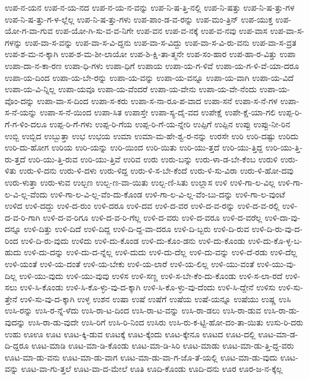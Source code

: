 {ಉಪ-ನ-ಯನ
ಉಪ-ನ-ಯ-ನದ
ಉಪ-ನ-ಯ-ನ-ವನ್ನು
ಉಪ-ನಿ-ಷ-ತ್ತಿ-ನಲ್ಲಿ
ಉಪ-ನಿ-ಷತ್ತು
ಉಪ-ನಿ-ಷ-ತ್ತು-ಗಳ
ಉಪ-ನಿ-ಷ-ತ್ತು-ಗ-ಳ-ಲ್ಲೆಲ್ಲ
ಉಪ-ನಿ-ಷ-ತ್ತು-ಗಳು
ಉಪ-ಪಾಂ-ಡ-ವ-ರನ್ನು
ಉಪ-ಮಂ-ತ್ರಿನ್
ಉಪ-ಯುಕ್ತ
ಉಪ-ಯೋ-ಗ-ವಾ-ಗುವ
ಉಪ-ಯೋ-ಗಿ-ಸು-ವ-ವ-ನಿಗೇ
ಉಪ-ವನ
ಉಪ-ವ-ನಕ್ಕೆ
ಉಪ-ವ-ನವು
ಉಪ-ವಾಸ
ಉಪ-ವಾ-ಸ-ಗಳನ್ನು
ಉಪ-ವಾ-ಸ-ವನ್ನು
ಉಪ-ವಾ-ಸ-ವಿ-ದ್ದನು
ಉಪ-ವಾ-ಸ-ವಿದ್ದು
ಉಪ-ವಾ-ಸ-ವಿ-ರು-ವನು
ಉಪ-ವಾ-ಸ-ವ್ರತ
ಉಪ-ಶ-ಮ-ನ-ಕ್ಕಾಗಿ
ಉಪ-ಶ-ಮ-ಶೀ-ಲಾಯೋ
ಉಪ-ಶಿ-ಕ್ಷಿ-ತಾ-ತ್ಮನೇ
ಉಪ-ಸಂ-ಹಾರ
ಉಪ-ಹಾ-ರ-ವಿತ್ತು
ಉಪಾ
ಉಪಾ-ದಾ-ನ-ಕಾ-ರಣ
ಉಪಾ-ಧಿ-ಗಳು
ಉಪಾ-ಧಿಗೆ
ಉಪಾಯ
ಉಪಾ-ಯ-ಗ-ಳಿವೆ
ಉಪಾ-ಯ-ಗ-ಳಿ-ವೆ-ಯಾ-ದರೂ
ಉಪಾ-ಯ-ದಿಂದ
ಉಪಾ-ಯ-ಬೇ-ರನ್ನು
ಉಪಾ-ಯ-ವನ್ನು
ಉಪಾ-ಯ-ವನ್ನೂ
ಉಪಾ-ಯ-ವಾಗಿ
ಉಪಾ-ಯ-ವಿದೆ
ಉಪಾ-ಯ-ವಿ-ನ್ನಿಲ್ಲ
ಉಪಾ-ಯವೂ
ಉಪಾ-ಯ-ವೆಂದರೆ
ಉಪಾ-ಯ-ವೇನು
ಉಪಾ-ಯ-ವೇ-ನೆಂದು
ಉಪಾ-ಯ-ವೊಂ-ದನ್ನು
ಉಪಾ-ವಾ-ಸ-ದಿಂದ
ಉಪಾ-ಸ-ಕರು
ಉಪಾ-ಸ-ನಾ-ರೂ-ಪ-ವಾದ
ಉಪಾ-ಸನೆ
ಉಪಾ-ಸ-ನೆ-ಗಳ
ಉಪಾ-ಸ-ನೆ-ಯನ್ನು
ಉಪಾ-ಸ-ನೆ-ಯಿಂದ
ಉಪಾ-ಸಿತ
ಉಪಾಸ್ತೇ
ಉಪಾ-ಸ್ಯ-ದೈ-ವದ
ಉಪೇಕ್ಷೆ
ಉಪೇ-ಕ್ಷೆ-ಯಾ-ಗಲಿ
ಉಪ್ಪ-ರಿ-ಗೆ-ಗ-ಳಿಂ-ದಲೂ
ಉಪ್ಪ-ರಿ-ಗೆ-ಗಳು
ಉಪ್ಪ-ರಿ-ಗೆಯ
ಉಪ್ಪ-ರಿ-ಗೆ-ಯ-ನ್ನೇರಿ
ಉಪ್ಪಿಗೆ
ಉಪ್ಪಿನ
ಉಪ್ಪು
ಉಪ್ಪು-ನೀ-ರಿನ
ಉಬ್ಬಿ
ಉಬ್ಬಿದ
ಉಬ್ಬುತ್ತಾ
ಉಭ
ಉಭಯ
ಉಮಾ
ಉಮಾ-ಮ-ಹೇ-ಶ್ವ-ರ-ನನ್ನು
ಉರಸೇ
ಉರಿ
ಉರಿ-ದಷ್ಟು
ಉರಿದು
ಉರಿ-ದು-ಹೋಗ
ಉರಿಯ
ಉರಿ-ಯನ್ನು
ಉರಿ-ಯಿಂದ
ಉರಿ-ಯಿತು
ಉರಿ-ಯು-ತ್ತದೆ
ಉರಿ-ಯು-ತ್ತಿದ್ದ
ಉರಿ-ಯು-ತ್ತಿ-ರು-ತ್ತದೆ
ಉರಿ-ಯು-ತ್ತಿ-ರುವ
ಉರಿ-ಯು-ತ್ತಿವೆ
ಉರಿವ
ಉರು
ಉರು-ಬನ್ನು
ಉರು-ಳಾ-ಡ-ಬೇ-ಕೆಂಬ
ಉರುಳಿ
ಉರು-ಳಿತು
ಉರು-ಳಿ-ದನು
ಉರು-ಳಿ-ದಳು
ಉರು-ಳಿದ್ದ
ಉರು-ಳಿ-ಸ-ಬೇ-ಕೆಂದೆ
ಉರು-ಳಿ-ಸು-ವಿರಾ
ಉರು-ಳಿ-ಹೋ-ದವು
ಉರು-ಳುತ್ತಾ
ಉರು-ಳುವ
ಉಲ್ಬಣ
ಉಲ್ಬ-ಣ-ವಾ-ಯಿತು
ಉಲ್ಬ-ಣಿ-ಸಿತು
ಉಲ್ಲಾಸ
ಉಳಿ
ಉಳಿ-ಗಾ-ಲ-ವಿಲ್ಲ
ಉಳಿ-ಗಾ-ಲ-ವಿ-ಲ್ಲ-ವೆಂದು
ಉಳಿ-ಗಾ-ಲ-ವಿ-ಲ್ಲ-ವೆಂ-ದು-ಕೊಂಡ
ಉಳಿ-ಗಾ-ಲ-ವಿ-ಲ್ಲ-ವೆಂ-ಬು-ದನ್ನು
ಉಳಿ-ಗಾ-ಲ-ವುಂಟೆ
ಉಳಿದ
ಉಳಿ-ದದ್ದು
ಉಳಿ-ದ-ರುಂ
ಉಳಿ-ದರೂ
ಉಳಿ-ದವ
ಉಳಿ-ದ-ವರ
ಉಳಿ-ದ-ವ-ರನ್ನು
ಉಳಿ-ದ-ವ-ರಲ್ಲಿ
ಉಳಿ-ದ-ವ-ರಿ-ಗಾಗಿ
ಉಳಿ-ದ-ವ-ರಿಗೂ
ಉಳಿ-ದ-ವ-ರಿ-ಗೆಲ್ಲ
ಉಳಿ-ದ-ವರು
ಉಳಿ-ದ-ವರೂ
ಉಳಿ-ದ-ವರೆಲ್ಲ
ಉಳಿ-ದಾ-ವು-ದನ್ನೂ
ಉಳಿ-ದಿತ್ತು
ಉಳಿ-ದಿದೆ
ಉಳಿ-ದಿದ್ದ
ಉಳಿ-ದಿ-ದ್ದ-ವಾ-ದರೂ
ಉಳಿ-ದಿ-ಬ್ಬರು
ಉಳಿ-ದಿ-ರುವ
ಉಳಿ-ದಿ-ರು-ವು-ದ-ರಿಂದ
ಉಳಿ-ದಿ-ರು-ವುದು
ಉಳಿದು
ಉಳಿ-ದು-ಕೊಂಡ
ಉಳಿ-ದು-ಕೊಂ-ಡನು
ಉಳಿ-ದು-ಕೊಂಡು
ಉಳಿ-ದು-ಕೊ-ಳ್ಳ-ಬ-ಹುದು
ಉಳಿ-ದು-ದನ್ನು
ಉಳಿ-ದು-ದ-ನ್ನೆಲ್ಲ
ಉಳಿ-ದುದು
ಉಳಿ-ದು-ದೆಲ್ಲ
ಉಳಿ-ದು-ವನ್ನು
ಉಳಿ-ದೆ-ರಡು
ಉಳಿ-ದೆಲ್ಲ
ಉಳಿ-ಯಂತೆ
ಉಳಿ-ಯ-ದಂತೆ
ಉಳಿ-ಯ-ಬೇಕು
ಉಳಿ-ಯ-ಲಾರೆ
ಉಳಿ-ಯ-ಲಿಲ್ಲ
ಉಳಿ-ಯು-ವಂತೆ
ಉಳಿ-ಯು-ವು-ದಿಲ್ಲ
ಉಳಿ-ಯು-ವುದು
ಉಳಿ-ಯು-ವುವು
ಉಳಿಸ
ಉಳಿ-ಸಣ್ಣ
ಉಳಿ-ಸ-ಬೇ-ಕೆಂ-ದು-ಕೊಂಡು
ಉಳಿ-ಸ-ಲಾ-ರದೆ
ಉಳಿ-ಸಲು
ಉಳಿ-ಸಿ-ಕೊಂಡು
ಉಳಿ-ಸಿ-ಕೊ-ಳ್ಳು-ವು-ದ-ಕ್ಕಾಗಿ
ಉಳಿ-ಸಿ-ಕೊ-ಳ್ಳು-ವು-ದೆಂದು
ಉಳಿ-ಸಿ-ದ್ದೇನೆ
ಉಳಿಸು
ಉಳಿ-ಸು-ತ್ತೇನೆ
ಉಳಿ-ಸು-ವು-ದ-ಕ್ಕಾಗಿ
ಉಳ್ಳ
ಉಶನ
ಉಷಾ
ಉಷೆ
ಉಷೆಗೆ
ಉಷೆಯ
ಉಷೆ-ಯನ್ನೂ
ಉಷೆಯು
ಉಷ್ಣ
ಉಸಿ
ಉಸಿ-ರನ್ನು
ಉಸಿ-ರ-ನ್ನೆ-ಳೆದು
ಉಸಿ-ರಾ-ಟ-ದಿಂದ
ಉಸಿ-ರಾ-ಟ-ವನ್ನು
ಉಸಿ-ರಾ-ಡಲು
ಉಸಿ-ರಾ-ಡುವ
ಉಸಿ-ರಾ-ಡು-ವುದನ್ನು
ಉಸಿ-ರಾ-ಡು-ವುದೇ
ಉಸಿ-ರಿಗೆ
ಉಸಿ-ರಿ-ನಿಂದ
ಉಸಿರು
ಉಸಿ-ರು-ಕ-ಟ್ಟಿ-ಹೋ-ದಂ-ತಾ-ಯಿತು
ಉಸು-ರಿ-ದರು
ಉಹು
ಊಊ
ಊಟ
ಊಟ-ಕ್ಕಿ-ಡುವ
ಊಟಕ್ಕೆ
ಊಟ-ಕ್ಕೆಂದು
ಊಟ-ಕ್ಕೇನೂ
ಊಟದ
ಊಟ-ದಲ್ಲಿ
ಊಟ-ಮಾ-ಡ-ದಿ-ದ್ದರೂ
ಊಟ-ಮಾಡಿ
ಊಟ-ಮಾ-ಡಿ-ಕೊಂಡು
ಊಟ-ಮಾ-ಡಿ-ಸಿರಿ
ಊಟ-ಮಾಡು
ಊಟ-ಮಾ-ಡು-ತ್ತಿ-ದ್ದ-ವರು
ಊಟ-ಮಾ-ಡು-ವನು
ಊಟ-ಮಾ-ಡು-ವಾಗ
ಊಟ-ಮಾ-ಡು-ವಾ-ಗ-ಜೊ-ತೆ-ಯಲ್ಲಿ
ಊಟ-ಮಾ-ಡು-ವುದು
ಊಟ-ವನ್ನು
ಊಟ-ವಾ-ಗು-ತ್ತಲೆ
ಊಟ-ವಾ-ದ-ಮೇಲೆ
ಊತಿ
ಊದಿ-ಕೊಂಡು
ಊದಿ-ದನು
ಊರ
ಊರ-ಜ-ನ-ಕ್ಕೆಲ್ಲ
}
